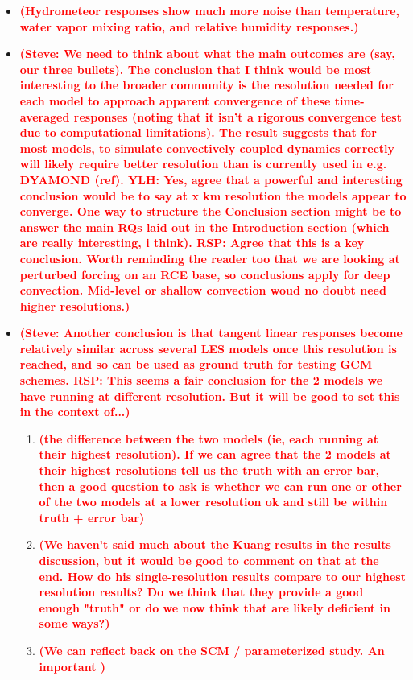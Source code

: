 \documentclass[draft]{agujournal2019}
\newcommand{\todo}[1]{\textcolor{red}{\textbf{(#1)}}}
\begin{document}
\begin{itemize}
\item \todo{Hydrometeor responses show much more noise than temperature, water
vapor mixing ratio, and relative humidity responses.}
\item \todo{Steve: We need to think about what the main outcomes are (say, our
three bullets). The conclusion that I think would be most interesting to the
broader community is the resolution needed for each model to approach apparent
convergence of these time-averaged responses (noting that it isn’t a rigorous
convergence test due to computational limitations).  The result suggests that
for most models, to simulate convectively coupled dynamics correctly will likely
require better resolution than is currently used in e.g. DYAMOND \todo{ref}.
YLH: Yes, agree that a powerful and interesting conclusion would be to say at x
km resolution the models appear to converge. One way to structure the Conclusion
section might be to answer the main RQs laid out in the Introduction section
(which are really interesting, i think). RSP: Agree that this is a key
conclusion. Worth reminding the reader too that we are looking at perturbed
forcing on an RCE base, so conclusions apply for deep convection. Mid-level or
shallow convection woud no doubt need higher resolutions.}
\item \todo{Steve: Another conclusion is that tangent linear responses become
relatively similar across several LES models once this resolution is reached,
and so can be used as ground truth for testing GCM schemes. RSP: This seems a
fair conclusion for the 2 models we have running at different resolution. But it
will be good to set this in the context of...}
\begin{enumerate}
\item \todo{the difference between the two models (ie, each running at their
highest resolution). If we can agree that the 2 models at their highest
resolutions tell us the truth with an error bar, then a good question to ask is
whether we can run one or other of the two models at a lower resolution ok and
still be within truth + error bar}
\item \todo{We haven't said much about the Kuang results in the results
discussion, but it would be good to comment on that at the end. How do his
single-resolution results compare to our highest resolution results? Do we think
that they provide a good enough "truth" or do we now think that are likely
deficient in some ways?}
\item \todo{We can reflect back on the SCM / parameterized study. An important
}
\end{enumerate}
\end{itemize}
\end{document}
